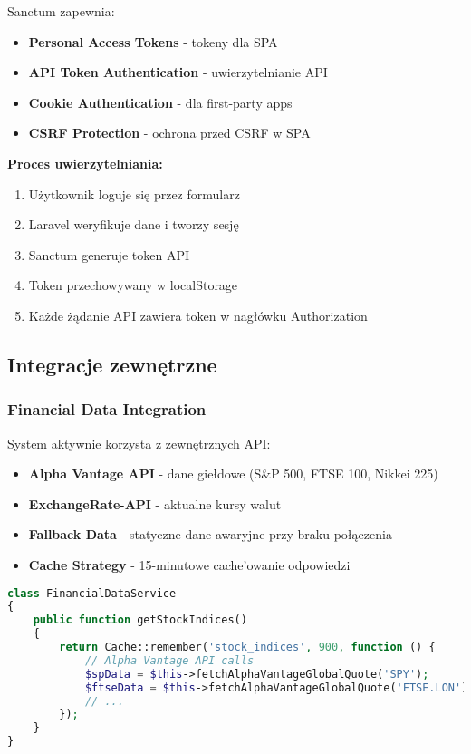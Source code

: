 \documentclass[12pt,a4paper]{article}
\begin{document}
    Sanctum zapewnia:

    \begin{itemize}
        \item \textbf{Personal Access Tokens} - tokeny dla SPA
        \item \textbf{API Token Authentication} - uwierzytelnianie API
        \item \textbf{Cookie Authentication} - dla first-party apps
        \item \textbf{CSRF Protection} - ochrona przed CSRF w SPA
    \end{itemize}

    \textbf{Proces uwierzytelniania:}

    \begin{enumerate}
        \item Użytkownik loguje się przez formularz
        \item Laravel weryfikuje dane i tworzy sesję
        \item Sanctum generuje token API
        \item Token przechowywany w localStorage
        \item Każde żądanie API zawiera token w nagłówku Authorization
    \end{enumerate}

    \subsection{Integracje zewnętrzne}

    \subsubsection{Financial Data Integration}
    System aktywnie korzysta z zewnętrznych API:

    \begin{itemize}
        \item \textbf{Alpha Vantage API} - dane giełdowe (S\&P 500, FTSE 100, Nikkei 225)
        \item \textbf{ExchangeRate-API} - aktualne kursy walut
        \item \textbf{Fallback Data} - statyczne dane awaryjne przy braku połączenia
        \item \textbf{Cache Strategy} - 15-minutowe cache'owanie odpowiedzi
    \end{itemize}

    \begin{lstlisting}[language=PHP, caption=Integracja z FinancialDataService]
class FinancialDataService
{
    public function getStockIndices()
    {
        return Cache::remember('stock_indices', 900, function () {
            // Alpha Vantage API calls
            $spData = $this->fetchAlphaVantageGlobalQuote('SPY');
            $ftseData = $this->fetchAlphaVantageGlobalQuote('FTSE.LON');
            // ...
        });
    }
}
    \end{lstlisting}
\end{document}
